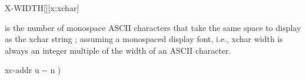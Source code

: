 \begin{worddef*}{}{X-WIDTH}[][x:xchar]
\item {}

	 is the number of monospace ASCII characters that take the same
	space to display as the xchar string ; assuming a
	monospaced display font, i.e., xchar width is always an integer multiple
	of the width of an ASCII character.

	\begin{implement}
	\word{:}   xc-addr u -{}- n ) \\
	    \word{+}   \\
	\tab[2]      \word{+} \\
	\tab {}  \word{-}  \word{;}
	\end{implement}
\end{worddef*}



